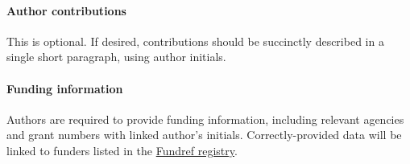 \documentclass[submission, Phys]{SciPost}
\begin{document}
\paragraph{Author contributions}
This is optional. If desired, contributions should be succinctly described in a single short paragraph, using author initials.

\paragraph{Funding information}
Authors are required to provide funding information, including relevant agencies and grant numbers with linked author's initials. Correctly-provided data will be linked to funders listed in the \href{https://www.crossref.org/services/funder-registry/}{\sf Fundref registry}.
\end{document}

